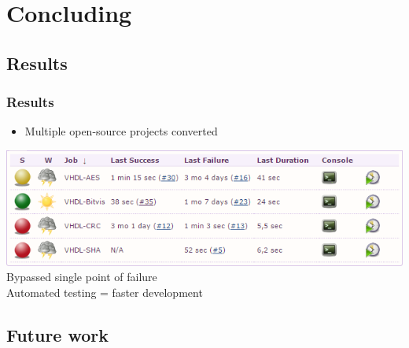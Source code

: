 \documentclass[british,10pt]{beamer}
\begin{document}

\section{Concluding}

\subsection{Results}
\begin{frame}\frametitle{Results}
\begin{itemize}
\item Multiple open-source projects converted
\end{itemize}
\medskip
{\centering
\includegraphics[width=\textwidth]{images/jobs.png}}
\\\hskip10pt Bypassed single point of failure
\\\hskip10pt Automated testing = faster development
\end{frame}


%

\subsection{Future work}
\end{document}
